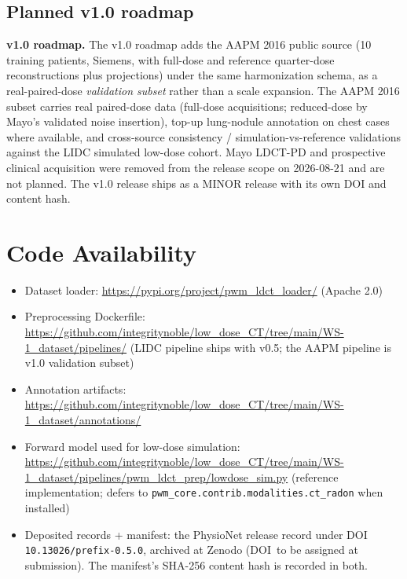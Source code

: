 \documentclass[twoside,11pt]{article}
\begin{document}
\subsection*{Planned v1.0 roadmap}

\textbf{v1.0 roadmap.} The v1.0 roadmap adds the AAPM 2016 public source (10 training patients, Siemens, with full-dose and reference quarter-dose reconstructions plus projections) under the same harmonization schema, as a real-paired-dose \emph{validation subset} rather than a scale expansion. The AAPM 2016 subset carries real paired-dose data (full-dose acquisitions; reduced-dose by Mayo's validated noise insertion), top-up lung-nodule annotation on chest cases where available, and cross-source consistency / simulation-vs-reference validations against the LIDC simulated low-dose cohort. Mayo LDCT-PD and prospective clinical acquisition were removed from the release scope on 2026-08-21 and are not planned. The v1.0 release ships as a MINOR release with its own DOI and content hash.

\section*{Code Availability}

\begin{itemize}
    \item Dataset loader: \url{https://pypi.org/project/pwm_ldct_loader/} (Apache 2.0)
    \item Preprocessing Dockerfile: \url{https://github.com/integritynoble/low_dose_CT/tree/main/WS-1_dataset/pipelines/} (LIDC pipeline ships with v0.5; the AAPM pipeline is v1.0 validation subset)
    \item Annotation artifacts: \url{https://github.com/integritynoble/low_dose_CT/tree/main/WS-1_dataset/annotations/}
    \item Forward model used for low-dose simulation: \url{https://github.com/integritynoble/low_dose_CT/tree/main/WS-1_dataset/pipelines/pwm_ldct_prep/lowdose_sim.py} (reference implementation; defers to \texttt{pwm\_core.contrib.modalities.ct\_radon} when installed)
    \item Deposited records + manifest: the PhysioNet release record under DOI \texttt{10.13026/prefix-0.5.0}, archived at Zenodo (DOI~to be assigned at submission). The manifest's SHA-256 content hash is recorded in both.
\end{itemize}
\end{document}
